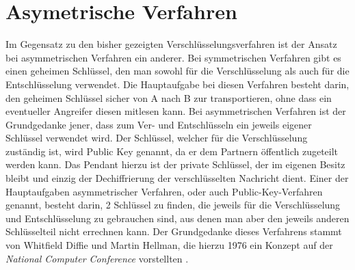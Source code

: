 \documentclass[10pt, a4paper,headsepline,pointednumbers]{scrreprt}
\begin{document}
\section{Asymetrische Verfahren}
Im Gegensatz zu den bisher gezeigten Verschlüsselungsverfahren ist der Ansatz bei asymmetrischen Verfahren ein anderer. Bei symmetrischen Verfahren gibt es einen geheimen Schlüssel, den man sowohl für die Verschlüsselung als auch für die Entschlüsselung verwendet. Die Hauptaufgabe bei diesen Verfahren besteht darin, den geheimen Schlüssel sicher von A nach B zur transportieren, ohne dass ein eventueller Angreifer diesen mitlesen kann. Bei asymmetrischen Verfahren ist der Grundgedanke jener, dass zum Ver- und Entschlüsseln ein jeweils eigener Schlüssel verwendet wird. Der Schlüssel, welcher für die Verschlüsselung zuständig ist, wird Public Key genannt, da er dem Partnern öffentlich zugeteilt werden kann. Das Pendant hierzu ist der private Schlüssel, der im eigenen Besitz bleibt und einzig der Dechiffrierung der verschlüsselten Nachricht dient. Einer der Hauptaufgaben asymmetrischer Verfahren, oder auch Public-Key-Verfahren genannt, besteht darin, 2 Schlüssel zu finden, die jeweils für die Verschlüsselung und Entschlüsselung zu gebrauchen sind, aus denen man aber den jeweils anderen Schlüsselteil nicht errechnen kann. Der Grundgedanke dieses Verfahrens stammt von Whitfield Diffie und Martin Hellman, die hierzu 1976 ein Konzept auf der \textit{National Computer Conference} vorstellten \citep[S. 525]{book:angewandte-krypto}.
\end{document}
